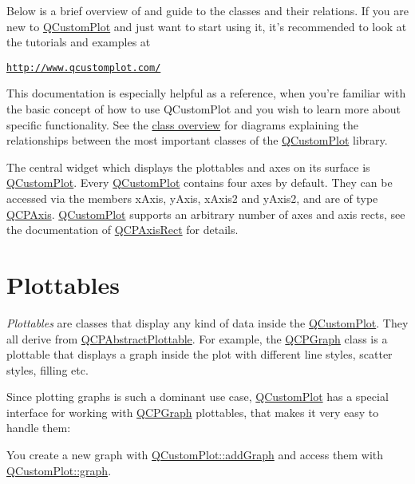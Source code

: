 

Below is a brief overview of and guide to the classes and their relations. If you are new to \hyperlink{class_q_custom_plot}{Q\-Custom\-Plot} and just want to start using it, it's recommended to look at the tutorials and examples at

\href{http://www.qcustomplot.com/}{\tt http\-://www.\-qcustomplot.\-com/}

This documentation is especially helpful as a reference, when you're familiar with the basic concept of how to use Q\-Custom\-Plot and you wish to learn more about specific functionality. See the \hyperlink{classoverview}{class overview} for diagrams explaining the relationships between the most important classes of the \hyperlink{class_q_custom_plot}{Q\-Custom\-Plot} library.

The central widget which displays the plottables and axes on its surface is \hyperlink{class_q_custom_plot}{Q\-Custom\-Plot}. Every \hyperlink{class_q_custom_plot}{Q\-Custom\-Plot} contains four axes by default. They can be accessed via the members x\-Axis, y\-Axis, x\-Axis2 and y\-Axis2, and are of type \hyperlink{class_q_c_p_axis}{Q\-C\-P\-Axis}. \hyperlink{class_q_custom_plot}{Q\-Custom\-Plot} supports an arbitrary number of axes and axis rects, see the documentation of \hyperlink{class_q_c_p_axis_rect}{Q\-C\-P\-Axis\-Rect} for details.\hypertarget{index_mainpage-plottables}{}\section{Plottables}\label{index_mainpage-plottables}
{\itshape Plottables} are classes that display any kind of data inside the \hyperlink{class_q_custom_plot}{Q\-Custom\-Plot}. They all derive from \hyperlink{class_q_c_p_abstract_plottable}{Q\-C\-P\-Abstract\-Plottable}. For example, the \hyperlink{class_q_c_p_graph}{Q\-C\-P\-Graph} class is a plottable that displays a graph inside the plot with different line styles, scatter styles, filling etc.

Since plotting graphs is such a dominant use case, \hyperlink{class_q_custom_plot}{Q\-Custom\-Plot} has a special interface for working with \hyperlink{class_q_c_p_graph}{Q\-C\-P\-Graph} plottables, that makes it very easy to handle them\-:\par
 You create a new graph with \hyperlink{class_q_custom_plot_a6fb2873d35a8a8089842d81a70a54167}{Q\-Custom\-Plot\-::add\-Graph} and access them with \hyperlink{class_q_custom_plot_a6d3ed93c2bf46ab7fa670d66be4cddaf}{Q\-Custom\-Plot\-::graph}.

